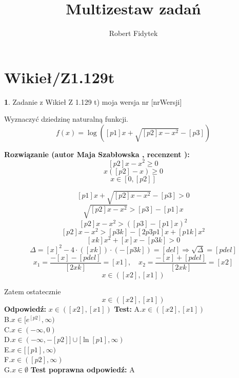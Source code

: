 \documentclass[12pt, a4paper]{article}
\title{Multizestaw zadań}
\author{Robert Fidytek}
\date{}
\theoremstyle{definition} %
\newtheorem{zad}{}
\newcommand{\kategoria}[1]{\section{#1}} %
\newcommand{\zadStart}[1]{\begin{zad}#1\newline} %
\newcommand{\zadStop}{\end{zad}}   %
\newcommand{\rozwStart}[2]{\noindent \textbf{Rozwiązanie (autor #1 , recenzent #2): }\newline} %
\newcommand{\rozwStop}{\newline}                                            %
\newcommand{\odpStart}{\noindent \textbf{Odpowiedź:}\newline}    %
\newcommand{\odpStop}{\newline}                                             %
\newcommand{\testStart}{\noindent \textbf{Test:}\newline} %
\newcommand{\testStop}{\newline} %
\newcommand{\kluczStart}{\noindent \textbf{Test poprawna odpowiedź:}\newline} %
\newcommand{\kluczStop}{\newline} %
\begin{document}
\maketitle


\kategoria{Wikieł/Z1.129t}
\zadStart{Zadanie z Wikieł Z 1.129 t) moja wersja nr [nrWersji]}

Wyznaczyć dziedzinę naturalną funkcji.
$$f(x)=\log \left([p1]x+\sqrt{[p2]x-x^{2}}-[p3]\right)$$
\zadStop

\rozwStart{Maja Szabłowska}{}
$$[p2]x-x^{2}\geq 0$$
$$x([p2]-x)\geq 0$$
$$x\in[0,[p2]]$$

$$[p1]x+\sqrt{[p2]x-x^{2}}-[p3]>0$$
$$\sqrt{[p2]x-x^{2}}>[p3]-[p1]x$$
$$[p2]x-x^{2}>([p3]-[p1]x)^{2}$$
$$[p2]x-x^{2}>[p3k]-[2p3p1]x+[p1k]x^{2} $$
$$[xk]x^{2}+[x]x-[p3k]>0$$
$$\Delta=[x]^{2}-4\cdot([xk])\cdot(-[p3k])=[del] \Rightarrow \sqrt{\Delta}=[pdel]$$
$$x_{1}=\frac{-[x]-[pdel]}{[2xk]}=[x1], \quad x_{2}=\frac{-[x]+[pdel]}{[2xk]}=[x2]$$
$$x\in([x2], [x1])$$

Zatem ostatecznie 
$$x\in([x2],[x1])$$
\rozwStop
\odpStart
$x\in([x2],[x1])$
\odpStop
\testStart
A.$x\in([x2],[x1])$\\
B.$x\in[e^{[p2]},\infty)$\\
C.$x\in(-\infty, 0)$\\
D.$x\in(-\infty, -[p2]] \cup [\ln[p1],\infty)$\\
E.$x\in[[p1],\infty)$\\
F.$x\in([p2],\infty)$\\
G.$x\in\emptyset$
\testStop
\kluczStart
A
\kluczStop
\end{document}

